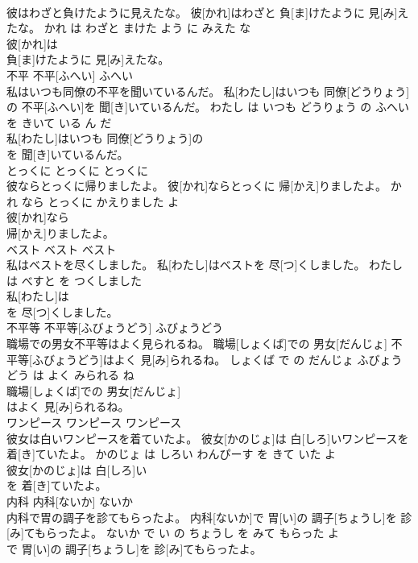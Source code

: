 \documentclass[8pt]{extreport}
\begin{document}
\begin{CJK}{UTF8}{min}
\\	彼はわざと負けたように見えたな。	彼[かれ]はわざと 負[ま]けたように 見[み]えたな。	かれ は わざと まけた よう に みえた な	
\\	彼[かれ]は
\\	負[ま]けたように 見[み]えたな。			
\\	不平	不平[ふへい]	ふへい	
\\	私はいつも同僚の不平を聞いているんだ。	私[わたし]はいつも 同僚[どうりょう]の 不平[ふへい]を 聞[き]いているんだ。	わたし は いつも どうりょう の ふへい を きいて いる ん だ	
\\	私[わたし]はいつも 同僚[どうりょう]の
\\	を 聞[き]いているんだ。			
\\	とっくに	とっくに	とっくに	
\\	彼ならとっくに帰りましたよ。	彼[かれ]ならとっくに 帰[かえ]りましたよ。	かれ なら とっくに かえりました よ	
\\	彼[かれ]なら
\\	帰[かえ]りましたよ。			
\\	ベスト	ベスト	ベスト	
\\	私はベストを尽くしました。	私[わたし]はベストを 尽[つ]くしました。	わたし は べすと を つくしました	
\\	私[わたし]は
\\	を 尽[つ]くしました。			
\\	不平等	不平等[ふびょうどう]	ふびょうどう	
\\	職場での男女不平等はよく見られるね。	職場[しょくば]での 男女[だんじょ] 不平等[ふびょうどう]はよく 見[み]られるね。	しょくば で の だんじょ ふびょうどう は よく みられる ね	
\\	職場[しょくば]での 男女[だんじょ]
\\	はよく 見[み]られるね。			
\\	ワンピース	ワンピース	ワンピース	
\\	彼女は白いワンピースを着ていたよ。	彼女[かのじょ]は 白[しろ]いワンピースを 着[き]ていたよ。	かのじょ は しろい わんぴーす を きて いた よ	
\\	彼女[かのじょ]は 白[しろ]い
\\	を 着[き]ていたよ。			
\\	内科	内科[ないか]	ないか	
\\	内科で胃の調子を診てもらったよ。	内科[ないか]で 胃[い]の 調子[ちょうし]を 診[み]てもらったよ。	ないか で い の ちょうし を みて もらった よ	
\\	で 胃[い]の 調子[ちょうし]を 診[み]てもらったよ。			

\end{CJK}
\end{document}
